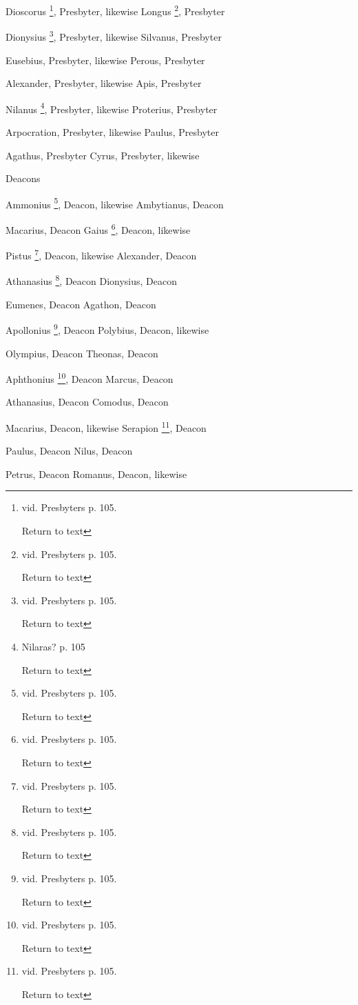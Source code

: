 Dioscorus \footnote{vid.
Presbyters p. 105.

Return to text}, Presbyter,
likewise
Longus \footnote{vid.
Presbyters p. 105.

Return to text}, Presbyter

Dionysius \footnote{vid.
Presbyters p. 105.

Return to text}, Presbyter,
likewise
Silvanus, Presbyter

Eusebius, Presbyter, likewise
Perous, Presbyter

Alexander, Presbyter, likewise
Apis, Presbyter

Nilanus \footnote{Nilaras? p.
105

Return to text},
Presbyter, likewise
Proterius, Presbyter

Arpocration, Presbyter, likewise
Paulus, Presbyter

Agathus, Presbyter
Cyrus, Presbyter, likewise

Deacons

Ammonius \footnote{vid.
Presbyters p. 105.

Return to text},
Deacon, likewise
Ambytianus, Deacon

Macarius, Deacon
Gaius \footnote{vid.
Presbyters p. 105.

Return to text}, Deacon, likewise

Pistus \footnote{vid.
Presbyters p. 105.

Return to text}, Deacon, likewise
Alexander, Deacon

Athanasius \footnote{vid.
Presbyters p. 105.

Return to text}, Deacon
Dionysius, Deacon

Eumenes, Deacon
Agathon, Deacon

Apollonius \footnote{vid.
Presbyters p. 105.

Return to text}, Deacon
Polybius, Deacon, likewise

Olympius, Deacon
Theonas, Deacon

Aphthonius \footnote{vid.
Presbyters p. 105.

Return to text}, Deacon
Marcus, Deacon

Athanasius, Deacon
Comodus, Deacon

Macarius, Deacon, likewise
Serapion \footnote{vid.
Presbyters p. 105.

Return to text}, Deacon

Paulus, Deacon
Nilus, Deacon

Petrus, Deacon
Romanus, Deacon, likewise

